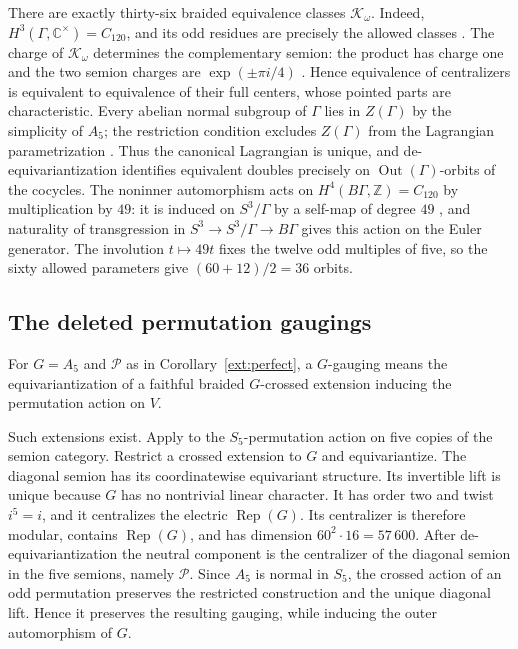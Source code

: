 \documentclass[11pt]{amsart}
\numberwithin{equation}{section}
\theoremstyle{definition}
\theoremstyle{plain}
\begin{document}
There are exactly thirty-six braided equivalence classes
$\mathcal K_\omega$. Indeed, $H^3(\Gamma,\mathbb C^\times)=C_{120}$,
and its odd residues are precisely the allowed classes
\cite[\S4, Example~3]{MasonNgOrbifolds}.
The charge of $\mathcal K_\omega$ determines the complementary semion:
the product has charge one and the two semion charges are
$\exp(\pm\pi i/4)$ \cite[Lemmas~5.26--5.27]{DMNOWitt}.
Hence equivalence of centralizers is equivalent to equivalence of their
full centers, whose pointed parts are characteristic.
Every abelian normal subgroup of $\Gamma$ lies in $Z(\Gamma)$ by the
simplicity of $A_5$; the restriction condition excludes $Z(\Gamma)$
from the Lagrangian parametrization
\cite[Theorem~1.2]{NNLagrangian}. Thus the canonical Lagrangian is unique,
and de-equivariantization identifies equivalent doubles precisely on
$\operatorname{Out}(\Gamma)$-orbits of the cocycles.
The noninner automorphism acts on $H^4(B\Gamma,\mathbb Z)=C_{120}$ by
multiplication by $49$: it is induced on $S^3/\Gamma$ by a self-map of
degree $49$ \cite[\S4.5]{HKWZ}, and naturality of transgression in
$S^3\to S^3/\Gamma\to B\Gamma$ gives this action on the Euler generator.
The involution $t\mapsto49t$ fixes the twelve odd multiples of five,
so the sixty allowed parameters give $(60+12)/2=36$ orbits.

\subsection{The deleted permutation gaugings}\label{ext:deleted-gauging}

For $G=A_5$ and $\mathcal P$ as in Corollary~\ref{ext:perfect}, a
$G$-gauging means the equivariantization of a faithful
braided $G$-crossed extension inducing the permutation action on $V$.

Such extensions exist. Apply \cite[Theorem~1.1 and Corollary~1.2]{GannonJonesPermutation}
to the $S_5$-permutation action on five copies of the semion category.
Restrict a crossed extension to $G$ and equivariantize. The diagonal
semion has its coordinatewise equivariant structure. Its invertible
lift is unique because $G$ has no nontrivial linear character. It has
order two and twist $i^5=i$, and it centralizes the electric
$\operatorname{Rep}(G)$. Its centralizer is therefore modular, contains
$\operatorname{Rep}(G)$, and has dimension $60^2\cdot16=57\,600$.
After de-equivariantization the neutral component is the centralizer of
the diagonal semion in the five semions, namely $\mathcal P$.
Since $A_5$ is normal in $S_5$, the crossed action of an odd
permutation preserves the restricted construction and the unique diagonal lift. Hence it preserves the resulting gauging, while inducing
the outer automorphism of $G$.
\end{document}
